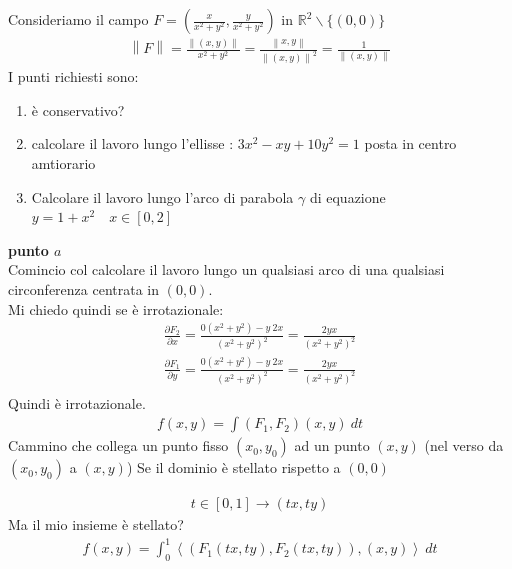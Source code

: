 \documentclass[a4paper, oneside]{article}
\begin{document}
\begin{example}
    Consideriamo il campo $F=(\frac{x}{x^2+y^2} , \frac{y}{x^2+y^2})$ in $\mathbb{R}^2 \backslash \{(0,0)\}$
    \begin{gather*}
        \left\lVert F \right\rVert = \frac{\left\lVert (x,y) \right\rVert }{x^2+y^2} =  \frac{\left\lVert x,y \right\rVert }{\left\lVert (x,y) \right\rVert^2 } = \frac{1}{\left\lVert (x,y) \right\rVert }
    \end{gather*}
    I punti richiesti sono:
    \begin{enumerate}[$a)$]
        \item è conservativo?
        \item calcolare il lavoro lungo l'ellisse : $3x^2 - xy + 10y^2 = 1$ posta in centro amtiorario
        \item Calcolare il lavoro lungo l'arco di parabola $\gamma$ di equazione $y=1+x^2 \quad x \in [0,2]$
    \end{enumerate}
    \textbf{punto $a$}\\
    Comincio col calcolare il lavoro lungo un qualsiasi arco di una qualsiasi circonferenza centrata in $(0,0)$.\\
    Mi chiedo quindi se è irrotazionale:
    \begin{gather*}
        \frac{\partial F_2}{\partial x} = \frac{0 (x^2+y^2) - y \ 2x}{(x^2+y^2)^2} = \frac{2 y x}{(x^2+y^2)^2}\\
        \frac{\partial F_1}{\partial y} = \frac{0 (x^2+y^2) - y \ 2x}{(x^2+y^2)^2} = \frac{2 y x}{(x^2+y^2)^2}\\
    \end{gather*}
    Quindi è irrotazionale.
    \begin{gather*}
        f(x,y) = \int (F_1,F_2) (x,y) \ dt    
    \end{gather*}
    Cammino che collega un punto fisso $(x_0,y_0)$ ad un punto $(x,y)$ (nel verso da $(x_0,y_0)$ a $(x,y)$)
Se il dominio è stellato rispetto a $(0,0)$
\begin{center}
\end{center}
\begin{gather*}
    t \in [0,1] \to (tx,ty)
\end{gather*}
Ma il mio insieme è stellato?
\begin{gather*}
    f(x,y) = \int_{0}^{1} \left\langle \left(F_1(tx,ty), F_2(tx,ty)\right) , (x,y)  \right\rangle \ dt 

\end{gather*}
\end{example}
\end{document}
